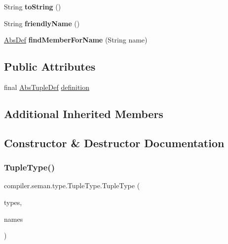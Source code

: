\begin{DoxyCompactItemize}
\item 
\mbox{\label{classcompiler_1_1seman_1_1type_1_1_tuple_type_ab2675d7a921469747661e22af676bd87}} 
String {\bfseries to\+String} ()
\item 
\mbox{\label{classcompiler_1_1seman_1_1type_1_1_tuple_type_abb1e95754c58c1a8cbc186e77432be2b}} 
String {\bfseries friendly\+Name} ()
\item 
\mbox{\label{classcompiler_1_1seman_1_1type_1_1_tuple_type_aca4d4292609db3c5d17cbfac293680bd}} 
\hyperlink{classcompiler_1_1abstr_1_1tree_1_1def_1_1_abs_def}{Abs\+Def} {\bfseries find\+Member\+For\+Name} (String name)
\end{DoxyCompactItemize}
\subsection*{Public Attributes}
\begin{DoxyCompactItemize}
\item 
final \hyperlink{classcompiler_1_1abstr_1_1tree_1_1def_1_1_abs_tuple_def}{Abs\+Tuple\+Def} \hyperlink{classcompiler_1_1seman_1_1type_1_1_tuple_type_a459e333d721e5853a0394cd9778b41f4}{definition}
\end{DoxyCompactItemize}
\subsection*{Additional Inherited Members}


\subsection{Constructor \& Destructor Documentation}
\mbox{\label{classcompiler_1_1seman_1_1type_1_1_tuple_type_a61612bd28ef2f393b303123e02d9ffcd}} 
\subsubsection{\texorpdfstring{Tuple\+Type()}{TupleType()}\hspace{0.1cm}{\footnotesize\ttfamily [1/2]}}
{\footnotesize\ttfamily compiler.\+seman.\+type.\+Tuple\+Type.\+Tuple\+Type (\begin{DoxyParamCaption}\item[{Linked\+List$<$ \hyperlink{classcompiler_1_1seman_1_1type_1_1_type}{Type} $>$}]{types,  }\item[{Linked\+List$<$ String $>$}]{names }\end{DoxyParamCaption})}

